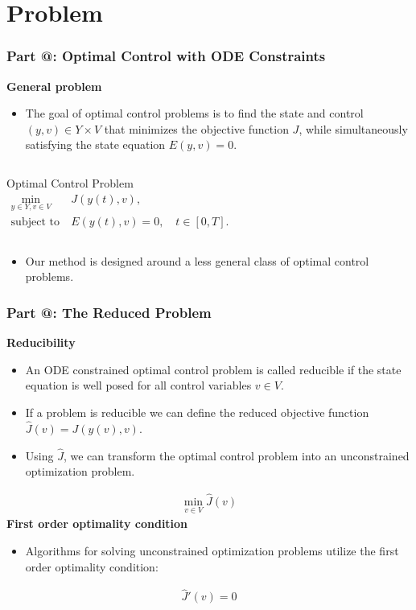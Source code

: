 \documentclass[9pt]{beamer}
\makeatletter
\newcommand*{\rom}[1]{\expandafter\@slowromancap\romannumeral #1@}
\makeatother
\begin{document}
\section{Problem}
\begin{frame}
\frametitle{\textbf{ Part \rom{1}:} Optimal Control with ODE Constraints}
\textbf{General problem}
\begin{itemize}
\item{The goal of optimal control problems is to find the state and control $(y,v)\in Y\times V$ that minimizes the objective function $J$, while simultaneously satisfying the state equation $E(y,v)=0$.}
\end{itemize}
\begin{columns}
\begin{block}{Optimal Control Problem}
\begin{align*}
\min_{y\in Y,v\in V} &J(y(t),v), \\
\textrm{subject to} \ &E(y(t),v)=0,\quad t\in[0,T].
\end{align*}
\end{block}
\end{columns}
\begin{itemize}
\item{Our method is designed around a less general class of optimal control problems.}
\end{itemize}
\end{frame}
\begin{frame}
\frametitle{\textbf{ Part \rom{1}:} The Reduced Problem}
\textbf{Reducibility}
\begin{itemize}
\item{An ODE constrained optimal control problem is called reducible if the state equation is well posed for all control variables $v\in V$.}
\item{If a problem is reducible we can define the reduced objective function $\hat{J}(v) = J(y(v),v)$.}
\item{Using $\hat J$, we can transform the optimal control problem into an unconstrained optimization problem.}
\end{itemize}
\begin{align*}
\min_{v\in V}\hat J (v)
\end{align*}
\textbf{First order optimality condition}
\begin{itemize}
\item{Algorithms for solving unconstrained optimization problems utilize the first order optimality condition:}
\end{itemize}
\begin{align*}
\hat J'(v) = 0
\end{align*}
\end{frame}
\end{document}
